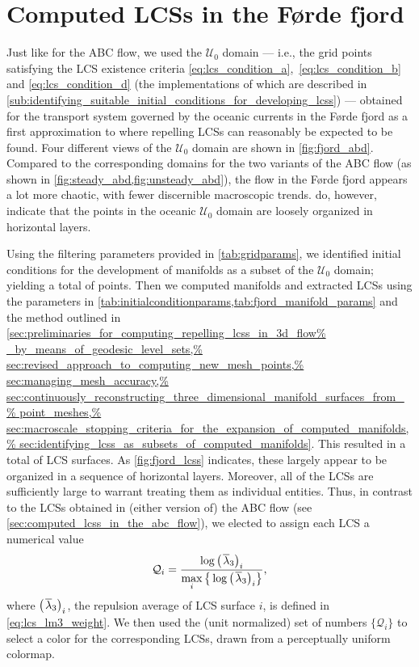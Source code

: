 \section{Computed LCSs in the Førde fjord}
\label{sec:computed_lcss_in_the_forde_fjord}

Just like for the ABC flow, we used the $\mathcal{U}_{0}$ domain --- i.e.,
the grid points satisfying the LCS existence criteria
\eqref{eq:lcs_condition_a},~\eqref{eq:lcs_condition_b} and
\eqref{eq:lcs_condition_d} (the implementations of which are described in
\cref{sub:identifying_suitable_initial_conditions_for_developing_lcss}) ---
obtained for the transport system governed by the oceanic currents in the
Førde fjord as a first approximation to where repelling LCSs can reasonably
be expected to be found. Four different views of the $\mathcal{U}_{0}$ domain
are shown in \cref{fig:fjord_abd}. Compared to the corresponding domains
for the two variants of the ABC flow (as shown in
\cref{fig:steady_abd,fig:unsteady_abd}), the flow in the Førde fjord appears
a lot more chaotic, with fewer discernible macroscopic trends.
 do, however, indicate that the
points in the oceanic $\mathcal{U}_{0}$ domain are loosely organized
in horizontal layers.



Using the filtering parameters provided in \cref{tab:gridparams}, we identified
initial conditions for the development of manifolds as a subset of the
$\mathcal{U}_{0}$ domain; yielding a total of  points.
Then we computed manifolds and extracted LCSs using the parameters
in \cref{tab:initialconditionparams,tab:fjord_manifold_params} and the method
outlined in \cref{sec:preliminaries_for_computing_repelling_lcss_in_3d_flow%
    _by_means_of_geodesic_level_sets,%
    sec:revised_approach_to_computing_new_mesh_points,%
    sec:managing_mesh_accuracy,%
    sec:continuously_reconstructing_three_dimensional_manifold_surfaces_from_%
    point_meshes,%
    sec:macroscale_stopping_criteria_for_the_expansion_of_computed_manifolds,%
    sec:identifying_lcss_as_subsets_of_computed_manifolds}. This resulted in
a total of  LCS surfaces. As \cref{fig:fjord_lcss} indicates,
these largely appear to be organized in a sequence of horizontal layers.
Moreover, all of the LCSs are sufficiently large to warrant treating them
as individual entities. Thus, in contrast to the LCSs obtained in (either
version of) the ABC flow (see \cref{sec:computed_lcss_in_the_abc_flow}), we
elected to assign each LCS a numerical value
\begin{equation}
    \label{eq:fjord_lcs_colorscaling}
    \mathcal{Q}_{i} = %
    \frac{\log{{\big({\mkern2mu}\overline{\lambda}_{3}\big)}_{i}}}%
    {\max\limits_{i}%
    \big\{\log{{\big({\mkern2mu}\overline{\lambda}_{3}\big)}_{i}}\big\}},
\end{equation}
where ${\big({\mkern2mu}\overline{\lambda}_{3}}\big)_{i}$, the repulsion
average of LCS surface $i$, is defined in \cref{eq:lcs_lm3_weight}. We then
used the (unit normalized) set of numbers $\big\{\mathcal{Q}_{i}\big\}$ to
select a color for the corresponding LCSs, drawn from a perceptually uniform
colormap.

